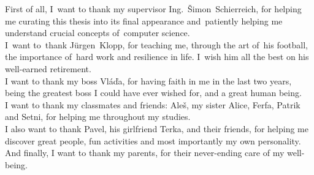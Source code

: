 \documentclass[english,bachelor,unicode,twoside]{ctufit-thesis}
\theoremstyle{plain}
\theoremstyle{definition}
\theoremstyle{remark}
\numberwithin{theorem}{chapter}
\begin{document}
\def\sectionautorefname{Section}
\def\subsectionautorefname{Subsection}
\def\subsubsectionautorefname{Subsubection}
\frontmatter\frontmatterinit %


\thispagestyle{empty}\cleardoublepage\maketitle %

\imprintpage %

\tableofcontents %
\listoffigures %
\begingroup
\let\clearpage\relax
\listoftables %
\lstlistoflistings %
\endgroup

\begin{acknowledgmentpage}
    First of all, I~want to thank my supervisor Ing.~Šimon~Schierreich, for helping me curating this thesis into its final appearance and~patiently helping me understand crucial concepts of~computer science.\\
    
    I~want to~thank Jürgen~Klopp, for teaching me, through the art of~his football, the importance of~hard work and resilience in life. I~wish him all the best on his well-earned retirement.\\
    
    I want to thank my boss Vláďa, for having faith in me in the last two years, being the greatest boss I could have ever wished for, and a great human being.\\

    I want to thank my classmates and friends: Aleš, my sister Alice, Ferfa, Patrik and Setni, for helping me throughout my studies.\\
    
    I also want to thank Pavel, his girlfriend Terka, and their friends, for helping me discover great people, fun activities and most importantly my own personality.\\
    
    And finally, I want to thank my parents, for their never-ending care of my well-being.
    
\end{acknowledgmentpage} 
\end{document}
